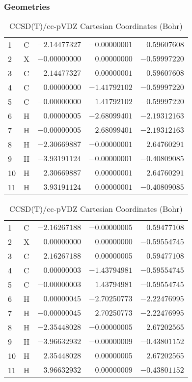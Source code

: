 \documentclass[10pt,oneside]{article}
\begin{document}
\begin{table}[h!]
\subsubsection*{Geometries}
\begin{multicols}{2}
\centering
\caption{CCSD(T)/cc-pVTZ Cartesian Coordinates (Bohr)}
\begin{tabular}{llrrr}
\toprule
1  & C  & $-2.14477327$ & $-0.00000001$ & $ 0.59607608$ \\
2  & X  & $-0.00000000$ & $ 0.00000000$ & $-0.59997220$ \\
3  & C  & $ 2.14477327$ & $ 0.00000001$ & $ 0.59607608$ \\
4  & C  & $ 0.00000000$ & $-1.41792102$ & $-0.59997220$ \\
5  & C  & $-0.00000000$ & $ 1.41792102$ & $-0.59997220$ \\
6  & H  & $ 0.00000005$ & $-2.68099401$ & $-2.19312163$ \\
7  & H  & $-0.00000005$ & $ 2.68099401$ & $-2.19312163$ \\
8  & H  & $-2.30669887$ & $-0.00000001$ & $ 2.64760291$ \\
9  & H  & $-3.93191124$ & $-0.00000001$ & $-0.40809085$ \\
10 & H  & $ 2.30669887$ & $ 0.00000001$ & $ 2.64760291$ \\
11 & H  & $ 3.93191124$ & $ 0.00000001$ & $-0.40809085$ \\
\bottomrule
\end{tabular}
\caption{CCSD(T)/cc-pVDZ Cartesian Coordinates (Bohr)}
\begin{tabular}{llrrr}
\toprule
1  & C  & $-2.16267188$ & $-0.00000005$ & $ 0.59477108$ \\
2  & X  & $ 0.00000000$ & $ 0.00000000$ & $-0.59554745$ \\
3  & C  & $ 2.16267188$ & $ 0.00000005$ & $ 0.59477108$ \\
4  & C  & $ 0.00000003$ & $-1.43794981$ & $-0.59554745$ \\
5  & C  & $-0.00000003$ & $ 1.43794981$ & $-0.59554745$ \\
6  & H  & $ 0.00000045$ & $-2.70250773$ & $-2.22476995$ \\
7  & H  & $-0.00000045$ & $ 2.70250773$ & $-2.22476995$ \\
8  & H  & $-2.35448028$ & $-0.00000005$ & $ 2.67202565$ \\
9  & H  & $-3.96632932$ & $-0.00000009$ & $-0.43801152$ \\
10 & H  & $ 2.35448028$ & $ 0.00000005$ & $ 2.67202565$ \\
11 & H  & $ 3.96632932$ & $ 0.00000009$ & $-0.43801152$ \\
\bottomrule
\end{tabular}
\end{multicols}
\end{table}
\end{document}
